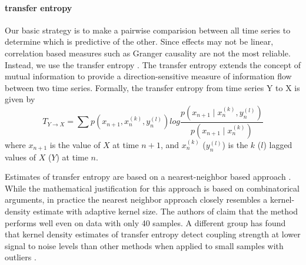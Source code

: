 
\paragraph{transfer entropy}
Our basic strategy is to make a pairwise comparision between all time series to determine which is predictive of the other. 
Since effects may not be linear, correlation based measures such as Granger causality are not the most reliable. 
Instead, we use the transfer entropy \cite{Schreiber2000}. 
The transfer entropy extends the concept of mutual information to provide a direction-sensitive measure of information flow between two time series.
Formally, the transfer entropy from time series Y to X is given by
\begin{equation}
T_{Y \rightarrow X} = \sum p(x_{n+1},x_n^{(k)},y_n^{(l)}) log 
\frac{p(x_{n+1} \mid x_n^{(k)}, y_n^{(l)})}{p(x_{n+1} \mid x_n^{(k)})}
\end{equation}
where $x_{n+1}$ is the value of $X$ at time $n+1$, and $x_n^{(k)}$ ($y_n^{(l)}$) is the $k$ ($l$) lagged values of $X$ ($Y$) at time $n$.


Estimates of transfer entropy are based on a nearest-neighbor based approach \cite{Kraskov2004}. While the mathematical justification for this approach is based on combinatorical arguments, in practice the nearest neighbor approach closely resembles a kernel-density estimate with adaptive kernel size.
The authors of \cite{Kraskov2004} claim that the method performs well even on data with only 40 samples. 
A different group has found that kernel density estimates of transfer entropy detect coupling strength at lower signal to noise levels than other methods when applied to small samples with outliers \cite{Lee2012}.

